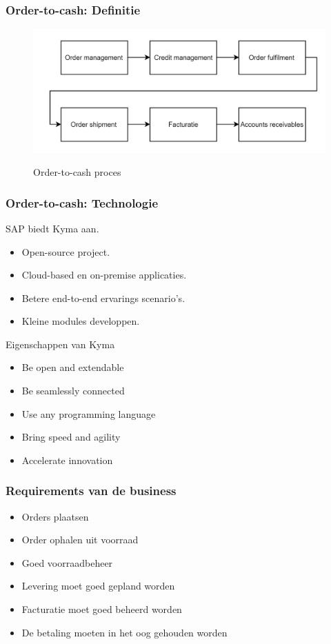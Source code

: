 \documentclass[aspectratio=169]{beamer}
\begin{document}
\begin{frame}
	\frametitle{Order-to-cash: Definitie}
	\begin{figure}
		\caption{Order-to-cash proces}
		\includegraphics[height=.8\textheight]{img/OTC.png}
		\label{img:Order-to-cash proces}
	\end{figure}
\end{frame}

\begin{frame}
	\frametitle{Order-to-cash: Technologie}
	SAP biedt Kyma aan.
	\begin{itemize}
		\item Open-source project.
		\item Cloud-based en on-premise applicaties.
		\item Betere end-to-end ervarings scenario's.
		\item Kleine modules developpen.
	\end{itemize}
\end{frame}

\begin{frame}
	Eigenschappen van Kyma
	\begin{itemize}
		\item Be open and extendable
		\item Be seamlessly connected
		\item Use any programming language
		\item Bring speed and agility
		\item Accelerate innovation
	\end{itemize}
\end{frame}

\begin{frame}
	\frametitle{Requirements van de business}
	\begin{itemize}
		\item Orders plaatsen
		\item Order ophalen uit voorraad
		\item Goed voorraadbeheer
		\item Levering moet goed gepland worden
		\item Facturatie moet goed beheerd worden
		\item De betaling moeten in het oog gehouden worden
	\end{itemize}
\end{frame}
\end{document}
